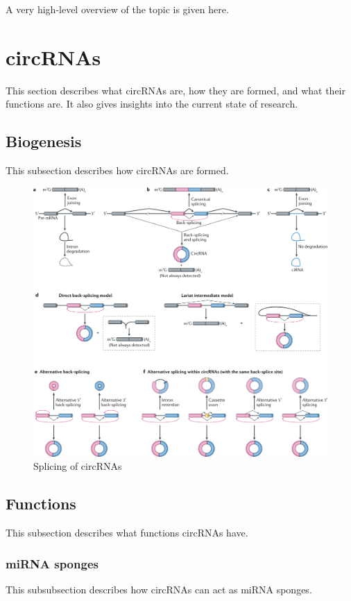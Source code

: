 A very high-level overview of the topic is given here.

\lipsum[1]

\section{circRNAs}
This section describes what circRNAs are, how they are formed, and what their functions are.
It also gives insights into the current state of research.

\subsection{Biogenesis}
This subsection describes how circRNAs are formed.

\begin{figure}[H]
    \centering
    \includegraphics[width=\textwidth]{chapters/background/figures/circRNA-splicing.png}
    \caption{Splicing of circRNAs}
    \label{fig:circRNA_splicing}
\end{figure}

\subsection{Functions}
This subsection describes what functions circRNAs have.

\subsubsection{miRNA sponges}
This subsubsection describes how circRNAs can act as miRNA sponges.

